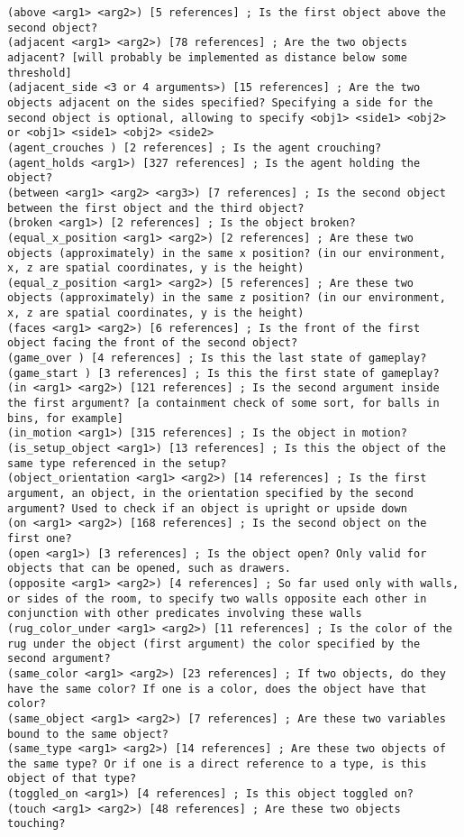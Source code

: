 \documentclass{article}
\begin{document}
\begin{lstlisting}
(above <arg1> <arg2>) [5 references] ; Is the first object above the second object?
(adjacent <arg1> <arg2>) [78 references] ; Are the two objects adjacent? [will probably be implemented as distance below some threshold]
(adjacent_side <3 or 4 arguments>) [15 references] ; Are the two objects adjacent on the sides specified? Specifying a side for the second object is optional, allowing to specify <obj1> <side1> <obj2> or <obj1> <side1> <obj2> <side2>
(agent_crouches ) [2 references] ; Is the agent crouching?
(agent_holds <arg1>) [327 references] ; Is the agent holding the object?
(between <arg1> <arg2> <arg3>) [7 references] ; Is the second object between the first object and the third object?
(broken <arg1>) [2 references] ; Is the object broken?
(equal_x_position <arg1> <arg2>) [2 references] ; Are these two objects (approximately) in the same x position? (in our environment, x, z are spatial coordinates, y is the height)
(equal_z_position <arg1> <arg2>) [5 references] ; Are these two objects (approximately) in the same z position? (in our environment, x, z are spatial coordinates, y is the height)
(faces <arg1> <arg2>) [6 references] ; Is the front of the first object facing the front of the second object?
(game_over ) [4 references] ; Is this the last state of gameplay?
(game_start ) [3 references] ; Is this the first state of gameplay?
(in <arg1> <arg2>) [121 references] ; Is the second argument inside the first argument? [a containment check of some sort, for balls in bins, for example]
(in_motion <arg1>) [315 references] ; Is the object in motion?
(is_setup_object <arg1>) [13 references] ; Is this the object of the same type referenced in the setup?
(object_orientation <arg1> <arg2>) [14 references] ; Is the first argument, an object, in the orientation specified by the second argument? Used to check if an object is upright or upside down
(on <arg1> <arg2>) [168 references] ; Is the second object on the first one?
(open <arg1>) [3 references] ; Is the object open? Only valid for objects that can be opened, such as drawers.
(opposite <arg1> <arg2>) [4 references] ; So far used only with walls, or sides of the room, to specify two walls opposite each other in conjunction with other predicates involving these walls
(rug_color_under <arg1> <arg2>) [11 references] ; Is the color of the rug under the object (first argument) the color specified by the second argument?
(same_color <arg1> <arg2>) [23 references] ; If two objects, do they have the same color? If one is a color, does the object have that color?
(same_object <arg1> <arg2>) [7 references] ; Are these two variables bound to the same object?
(same_type <arg1> <arg2>) [14 references] ; Are these two objects of the same type? Or if one is a direct reference to a type, is this object of that type?
(toggled_on <arg1>) [4 references] ; Is this object toggled on?
(touch <arg1> <arg2>) [48 references] ; Are these two objects touching?
\end{lstlisting}
\end{document}
